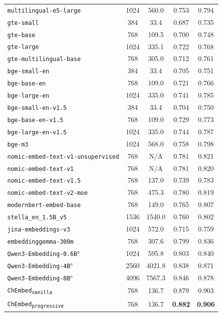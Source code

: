 \documentclass[twoside,twocolumn,9pt]{article}
\begin{document}
\begin{table}[!t]
\begin{tabular}{lcccc}
    \texttt{multilingual-e5-large} & 1024 & 560.0 & 0.753 & 0.794 \\
    \texttt{gte-small} & 384 & 33.4 & 0.687 & 0.735 \\
    \texttt{gte-base} & 768 & 109.5 & 0.700 & 0.748 \\
    \texttt{gte-large} & 1024 & 335.1 & 0.722 & 0.768 \\
    \texttt{gte-multilingual-base} & 768 & 305.0 & 0.712 & 0.761 \\
    \texttt{bge-small-en} & 384 & 33.4 & 0.705 & 0.751 \\
    \texttt{bge-base-en} & 768 & 109.0 & 0.721 & 0.766 \\
    \texttt{bge-large-en} & 1024 & 335.0 & 0.741 & 0.785 \\
    \texttt{bge-small-en-v1.5} & 384 & 33.4 & 0.704 & 0.750 \\
    \texttt{bge-base-en-v1.5} & 768 & 109.0 & 0.729 & 0.773 \\
    \texttt{bge-large-en-v1.5} & 1024 & 335.0 & 0.744 & 0.787 \\
    \texttt{bge-m3} & 1024 & 568.0 & 0.758 & 0.798 \\
    \texttt{nomic-embed-text-v1-unsupervised} & 768 & N/A & 0.781 & 0.821 \\
    \texttt{nomic-embed-text-v1} & 768 & N/A & 0.781 & 0.820 \\
    \texttt{nomic-embed-text-v1.5} & 768 & 137.0 & 0.739 & 0.783 \\
    \texttt{nomic-embed-text-v2-moe} & 768 & 475.3 & 0.780 & 0.819 \\
    \texttt{modernbert-embed-base} & 768 & 149.0 & 0.765 & 0.807 \\
    \texttt{stella\_en\_1.5B\_v5} & 1536 & 1540.0 & 0.760 & 0.802 \\
    \texttt{jina-embeddings-v3} & 1024 & 572.0 & 0.715 & 0.759 \\
    \texttt{embeddinggemma-300m} & 768 & 307.6 & 0.799 & 0.836 \\
    \texttt{Qwen3-Embedding-0.6B}$^{a}$ & 1024 & 595.8 & 0.803 & 0.840 \\
    \texttt{Qwen3-Embedding-4B}$^{a}$ & 2560 & 4021.8 & 0.838 & 0.871 \\
    \texttt{Qwen3-Embedding-8B}$^{a}$ & 4096 & 7567.3 & 0.846 & 0.878 \\
    \texttt{ChEmbed\textsubscript{vanilla}} & 768 & 136.7 & 0.879 & 0.903 \\
    \texttt{ChEmbed\textsubscript{progressive}} & 768 & 136.7 & \textbf{0.882} & \textbf{0.906} \\

\end{tabular}
\end{table}
\end{document}
